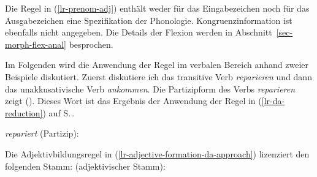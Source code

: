 {%
Die Regel in (\ref{lr-prenom-adj}) enthält weder für das Eingabezeichen noch für das Ausgabezeichen eine Spezifikation der Phonologie.
Kongruenzinformation ist ebenfalls nicht angegeben. Die Details der Flexion werden in Abschnitt~\ref{sec-morph-flex-anal}
besprochen.

Im Folgenden wird die Anwendung der Regel im verbalen Bereich anhand zweier Beispiele
diskutiert. Zuerst diskutiere ich das transitive Verb \emph{reparieren} und dann das unakkusativische Verb \emph{ankommen}.
Die Partizipform des Verbs \emph{reparieren} zeigt (). Dieses Wort ist
das Ergebnis der Anwendung der Regel in (\ref{lr-da-reduction}) auf S.\,\pageref{lr-da-reduction}.

\eas
\emph{repariert} (Partizip):\\
\zs

\noindent
Die Adjektivbildungsregel in (\ref{lr-adjective-formation-da-approach}) lizenziert
den folgenden Stamm:
\eas
{} (adjektivischer Stamm):\\
\zs

}

